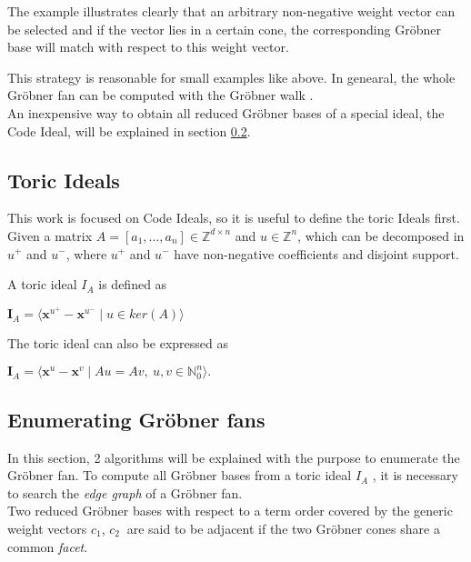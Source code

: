 The example illustrates clearly that an arbitrary non-negative weight vector can be selected and if the vector lies in a certain cone, the corresponding Gröbner base will match with respect to this weight vector.  


This strategy is reasonable for small examples like above.
In genearal, the whole Gröbner fan can be computed with the Gröbner walk \cite{coxOshea}.\\
An inexpensive way to obtain all reduced Gröbner bases of a special ideal, the Code Ideal, will be explained in section \ref{subsec:enumerate}.

\newpage
\subsection{Toric Ideals}
\label{subsec:toric}
This work is focused on Code Ideals, so it is useful to define the toric Ideals first. Given a matrix $A =\left[a_{1},\dots, a_{n}  \right] \in \mathbb{Z}^{d \times n } $ and $u \in \mathbb{Z}^{n}$, which can be decomposed in $u^{+} $ and $u^{-}$, where $u^{+} $ and $u^{-}$ have non-negative coefficients and disjoint support.

\begin{env_definition}
\cite{dueckjournal} A toric ideal $I_{A}$ is defined as
\begin{center}
$ \textbf{I}_{A} = \langle \textbf{x}^{u^{+}} - \textbf{x}^{u^{-}} \mid u \in ker \left(  A \right) \rangle  $
\end{center}


\end{env_definition}

The toric ideal can also be expressed as
\begin{center}
$ \textbf{I}_{A} =  \langle \textbf{x}^{u} - \textbf{x}^{v} \mid Au = Av,~ u,v \in \mathbb{N}^{n}_{0} \rangle .$
\end{center}



\subsection{Enumerating Gröbner fans}
\label{subsec:enumerate}

In this section, 2 algorithms will be explained with the  purpose to enumerate the Gröbner fan.
To compute all Gröbner bases from a toric ideal $I_A$ , it is necessary to search the \textit{edge graph} of a Gröbner fan.\\
Two reduced Gröbner bases with respect to a term order covered by the generic weight vectors $c_{1}$, $c_{2}~$ are said to be adjacent if the two Gröbner cones share a common \textit{facet}.

